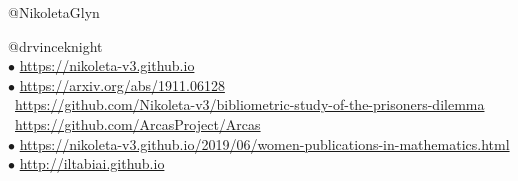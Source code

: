 \documentclass{beamer}
\begin{document}
\begin{frame}
    \begin{center}
    \faTwitter @NikoletaGlyn \\
    
    \vspace{1cm}
    \end{center}

    \footnotesize
    \faTwitter @drvinceknight \\
    $\bullet$ \url{https://nikoleta-v3.github.io} \\
    $\bullet$ \url{https://arxiv.org/abs/1911.06128} \\
    \faGithub  \ \url{https://github.com/Nikoleta-v3/bibliometric-study-of-the-prisoners-dilemma} \\
    \faGithub  \ \url{https://github.com/ArcasProject/Arcas} \\
    $\bullet$ \url{https://nikoleta-v3.github.io/2019/06/women-publications-in-mathematics.html} \\
    $\bullet$ \url{http://iltabiai.github.io} \\
\end{frame}
\end{document}
